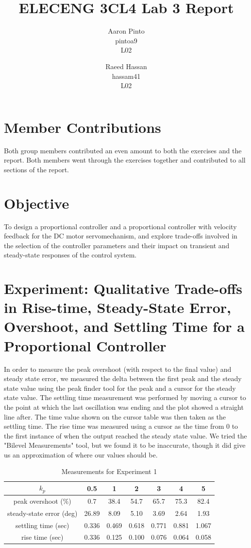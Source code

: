 \documentclass[12pt]{article}
\title{ELECENG 3CL4 Lab 3 Report}
\author{
    Aaron Pinto \\
    pintoa9 \\
    L02
    \and
    Raeed Hassan \\
    hassam41 \\
    L02
}
\begin{document}
\maketitle
\clearpage

\section*{Member Contributions} %
Both group members contributed an even amount to both the exercises and the report. Both members went through the exercises together and contributed to all sections of the report.

\section*{Objective}
To design a proportional controller and a proportional controller with velocity feedback for the DC motor servomechanism, and explore trade-offs involved in the selection of the controller parameters and their impact on transient and steady-state responses of the control system.

\setcounter{section}{2}
\section{Experiment: Qualitative Trade-offs in Rise-time, Steady-State Error, Overshoot, and Settling Time for a Proportional Controller}
In order to measure the peak overshoot (with respect to the final value) and steady state error, we measured the delta between the first peak and the steady state value using the peak finder tool for the peak and a cursor for the steady state value. The settling time measurement was performed by moving a cursor to the point at which the last oscillation was ending and the plot showed a straight line after. The time value shown on the cursor table was then taken as the settling time. The rise time was measured using a cursor as the time from 0 to the first instance of when the output reached the steady state value. We tried the "Bilevel Measurements" tool, but we found it to be inaccurate, though it did give us an approximation of where our values should be.

\begin{table}[h!]
\centering
\begin{tabular}{|c|c|c|c|c|c|c|} \hline
    $k_p$ & 0.5 & 1 & 2 & 3 & 4 & 5 \\ \hline
    peak overshoot (\%) & 0.7 & 38.4 & 54.7 & 65.7 & 75.3 & 82.4 \\ \hline
    steady-state error (deg) & 26.89 & 8.09 & 5.10 & 3.69 & 2.64 & 1.93 \\ \hline
    settling time (sec) & 0.336 & 0.469 & 0.618 & 0.771 & 0.881 & 1.067 \\ \hline
    rise time (sec) & 0.336 & 0.125 & 0.100 & 0.076 & 0.064 & 0.058 \\ \hline
\end{tabular}
\caption{\label{table:exp1_measurements}Measurements for Experiment 1}
\end{table}
\end{document}

